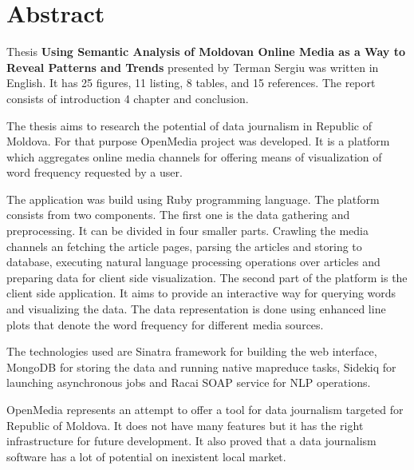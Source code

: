 \section*{Abstract}
Thesis \textbf{Using Semantic Analysis of Moldovan Online Media as a Way to Reveal Patterns and Trends} presented by Terman Sergiu was written in English. It has 25 figures, 11 listing, 8 tables, and 15 references. The report consists of introduction 4 chapter and conclusion.

The thesis aims to research the potential of data journalism in Republic of Moldova. For that purpose OpenMedia project was developed. It is a platform which aggregates online media channels for offering means of visualization of word frequency requested by a user.

The application was build using Ruby programming language. The platform consists from two components. The first one is the data gathering and preprocessing. It can be divided in four smaller parts. Crawling the media channels an fetching the article pages, parsing the articles and storing to database, executing natural language processing operations over articles and preparing data for client side visualization. The second part of the platform is the client side application. It aims to provide an interactive way for querying words and visualizing the data. The data representation is done using enhanced line plots that denote the word frequency for different media sources.

The technologies used are Sinatra framework for building the web interface, MongoDB for storing the data and running native mapreduce tasks, Sidekiq for launching asynchronous jobs and Racai SOAP service for NLP operations.

OpenMedia represents an attempt to offer a tool for data journalism targeted for Republic of Moldova. It does not have many features but it has the right infrastructure for future development. It also proved that a data journalism software has a lot of potential on inexistent local market.